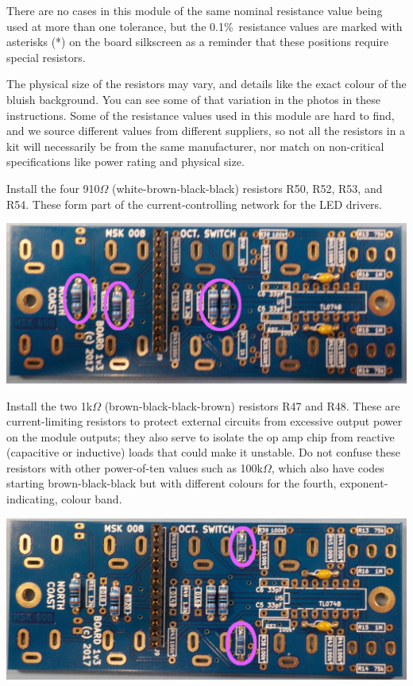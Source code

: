 There are no cases in this module of the same nominal resistance value being
used at more than one tolerance, but the 0.1\%\ resistance values are marked
with asterisks (*) on the board silkscreen as a reminder that these
positions require special resistors.

The physical size of the resistors may vary, and details like the exact
colour of the bluish background.  You can see some of that variation in the
photos in these instructions.  Some of the resistance values used in this
module are hard to find, and we source different values from different
suppliers, so not all the resistors in a kit will necessarily be from the
same manufacturer, nor match on non-critical specifications like power
rating and physical size.

Install the four 910$\Omega$ (white-brown-black-black) resistors R50, R52,
R53, and R54.  These form part of the current-controlling network for the
LED drivers.

\noindent\includegraphics[width=\linewidth]{res-910.jpg}

Install the two 1k$\Omega$ (brown-black-black-brown) resistors R47 and R48. 
These are current-limiting resistors to protect external circuits from
excessive output power on the module outputs; they also serve to isolate the
op amp chip from reactive (capacitive or inductive) loads that could make it
unstable.  Do not confuse these resistors with other power-of-ten values
such as 100k$\Omega$, which also have codes starting brown-black-black but
with different colours for the fourth, exponent-indicating, colour band.

\noindent\includegraphics[width=\linewidth]{res-1k.jpg}

